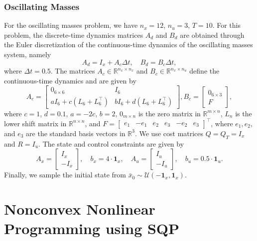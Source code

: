 \documentclass{article} %
\def\gU{{\mathcal{U}}}
\def\sR{{\mathbb{R}}}
\begin{document}
\subsubsection{Oscillating Masses}
For the oscillating masses problem, we have $n_x=12$, $n_u=3$, $T = 10$. For this problem, the discrete-time dynamics matrices $A_d$ and $B_d$ are obtained through the Euler discretization of the continuous-time dynamics of the oscillating masses system, namely
\begin{equation}
    A_d = I_x + A_c\Delta t, \quad B_d = B_c\Delta t,
\end{equation}
where $\Delta t = 0.5$. The matrices $A_c\in\sR^{n_x\times n_x}$ and $B_c\in\sR^{n_x\times n_u}$ define the continuous-time dynamics and are given by
\begin{equation}
    A_c = \begin{bmatrix}
        0_{6\times 6} & I_6 \\
        aI_6 + c(L_6 + L_6^\top) & bI_6 + d(L_6 + L_6^\top)
    \end{bmatrix}, B_c = \begin{bmatrix}
        0_{6\times 3} \\ F
    \end{bmatrix},
\end{equation}
where $c = 1$, $d=0.1$, $a=-2c$, $b = 2$, $0_{m\times n}$ is the zero matrix in $\sR^{m\times n}$, $L_n$ is the lower shift matrix in $\sR^{n\times n}$, and $F = \begin{bmatrix} e_1 & -e_1 & e_2 & e_3 & -e_2 & e_3 \end{bmatrix}^\top$, where $e_1, e_2,$ and $e_3$ are the standard basis vectors in $\sR^3$. We use cost matrices $Q= Q_T=I_x$ and $R = I_u$. The state and control constraints are given by
\begin{equation}
     A_x = \begin{bmatrix}
            I_x \\ -I_x
        \end{bmatrix}, \quad b_x = 4\cdot \bm{1}_x, \quad
        A_u = \begin{bmatrix}
            I_u \\ -I_u
        \end{bmatrix}, \quad b_u =  0.5 \cdot \bm1_u.
\end{equation}
Finally, we sample the initial state from $\bar{x}_0\sim \gU(-\bm1_x, \bm1_x)$.


\clearpage
\section{Nonconvex Nonlinear Programming using SQP}
\label{appendix:nonlinear_sqp}
\end{document}
